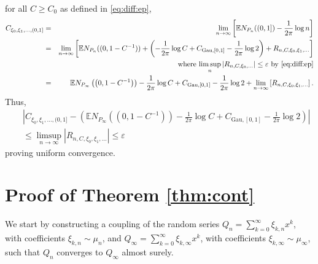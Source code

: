 \documentclass[12pt, reqno]{amsart}
\theoremstyle{plain}
\theoremstyle{definition}
\newcommand\E{{\mathbb{E}}}
\newcommand{\ep}{\varepsilon}
\begin{document}
for all $C\ge C_0$ as defined in \eqref{eq:diff:ep}, 
\begin{eqnarray*}
	C_{\xi_0, \xi_1, \dots, (0, 1]} &=& \lim_{n\to\infty} \left [\E N_{P_{n}}((0, 1]) -\frac{1}{2\pi}\log n\right ]\\
	&=& \lim_{n\to\infty}  \left [\E N_{P_{n}}((0, 1-C^{-1}))  +\left (-\frac{1}{2\pi}\log C+ C_{\mathrm{Gau}, [0, 1]}- \frac{1}{2\pi}\log 2\right )  + R_{n, C, \xi_0, \xi_1,\dots}\right ]\\
	&&\quad\quad\quad\quad \text{ where $\limsup_{n}|R_{n, C, \xi_0, \dots}|\le \ep$ by \eqref{eq:diff:ep}}\\
	&=& \E N_{P_{\infty}} \left (\left (0, 1-C^{-1}\right )\right )  -\frac{1}{2\pi}\log C+ C_{\mathrm{Gau}, [0, 1]}- \frac{1}{2\pi}\log 2  + \lim_{n\to\infty}  \left [R_{n, C, \xi_0,\xi_1, \dots}\right ].
\end{eqnarray*}
Thus, 
\begin{eqnarray*}
	&&\left |	C_{\xi_0, \xi_1, \dots, (0, 1]}  - \left (\E N_{P_{\infty}} \left (\left (0, 1-C^{-1}\right )\right )  -\frac{1}{2\pi}\log C+ C_{\mathrm{Gau}, [0, 1]}- \frac{1}{2\pi}\log 2 \right ) \right |\\
	&&\le \limsup_{n\to\infty}  \left |R_{n, C, \xi_0,\xi_1, \dots}\right |\le \ep
\end{eqnarray*}
proving uniform convergence.

\section{Proof of Theorem \ref{thm:cont}}\label{sec:cont}

We start by constructing a coupling of the random series $Q_{n}=\sum_{k=0}^{\infty} \xi_{k, n} x^{k}$, with coefficients $\xi_{k,n}\sim \mu_{n}$, and $Q_\infty=\sum_{k=0}^{\infty} \xi_{k,\infty} x^{k}$, with coefficients $\xi_{k, \infty}\sim \mu_\infty$, such that $Q_{n}$ converges to $Q_{\infty}$ almost surely.
\end{document}
